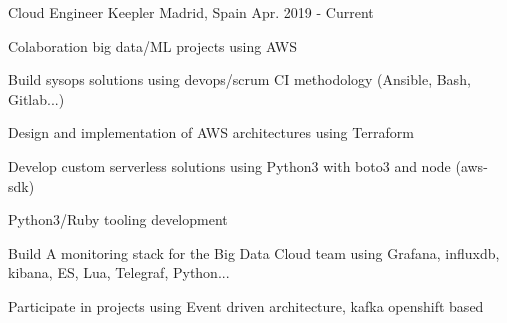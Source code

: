 

\begin{cventries}

  \cventry
    {Cloud Engineer} %
    {Keepler} %
    {Madrid, Spain} %
    {Apr. 2019 - Current} %
    {
      \begin{cvitems} %
        \item {Colaboration big data/ML projects using AWS}
        \item {Build sysops solutions using devops/scrum CI methodology (Ansible, Bash, Gitlab...)}
        \item {Design and implementation of AWS architectures using Terraform}
        \item {Develop custom serverless solutions using Python3 with boto3 and node (aws-sdk)} 
        \item {Python3/Ruby tooling development} 
        \item {Build A monitoring stack for the Big Data Cloud team using Grafana, influxdb, kibana, ES, Lua, Telegraf, Python...} 
        \item {Participate in projects using Event driven architecture, kafka openshift based} 
      \end{cvitems}
    }


\end{cventries}
